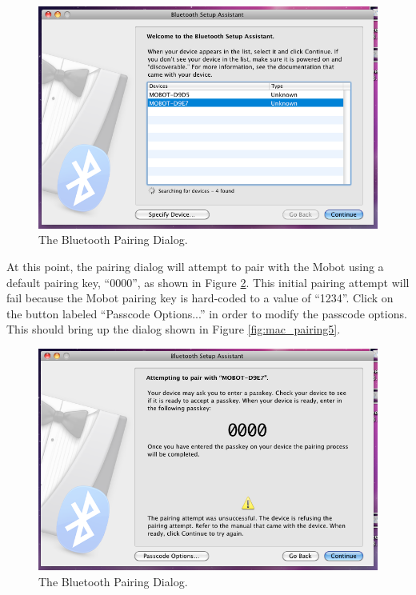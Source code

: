 \documentclass{article}
\begin{document}
\begin{figure}[H]
\begin{center}
\includegraphics[width=5in]{images/mac_pairing3.png}
\end{center}
\caption{\label{fig:mac_pairing3} The Bluetooth Pairing Dialog.}
\end{figure}

At this point, the pairing dialog will attempt to pair with the Mobot using a default pairing key, ``0000'', as
shown in Figure \ref{fig:mac_pairing4}. This initial pairing attempt will fail because the Mobot pairing key
is hard-coded to a value of ``1234''. Click on the button labeled ``Passcode Options...'' in order to 
modify the passcode options. This should bring up the dialog shown in Figure \ref{fig:mac_pairing5}.

\begin{figure}[H]
\begin{center}
\includegraphics[width=5in]{images/mac_pairing4.png}
\end{center}
\caption{\label{fig:mac_pairing4} The Bluetooth Pairing Dialog.}
\end{figure}
\end{document}

